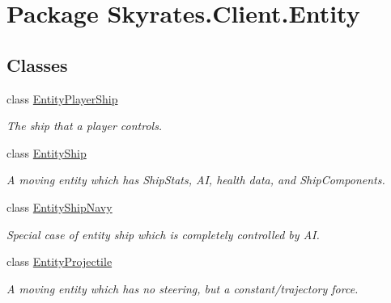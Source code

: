 \hypertarget{namespace_skyrates_1_1_client_1_1_entity}{\section{Package Skyrates.\-Client.\-Entity}
\label{namespace_skyrates_1_1_client_1_1_entity}
}
\subsection*{Classes}
\begin{DoxyCompactItemize}
\item 
class \hyperlink{class_skyrates_1_1_client_1_1_entity_1_1_entity_player_ship}{Entity\-Player\-Ship}
\begin{DoxyCompactList}\small\item\em The ship that a player controls. \end{DoxyCompactList}\item 
class \hyperlink{class_skyrates_1_1_client_1_1_entity_1_1_entity_ship}{Entity\-Ship}
\begin{DoxyCompactList}\small\item\em A moving entity which has Ship\-Stats, A\-I, health data, and Ship\-Components. \end{DoxyCompactList}\item 
class \hyperlink{class_skyrates_1_1_client_1_1_entity_1_1_entity_ship_navy}{Entity\-Ship\-Navy}
\begin{DoxyCompactList}\small\item\em Special case of entity ship which is completely controlled by A\-I. \end{DoxyCompactList}\item 
class \hyperlink{class_skyrates_1_1_client_1_1_entity_1_1_entity_projectile}{Entity\-Projectile}
\begin{DoxyCompactList}\small\item\em A moving entity which has no steering, but a constant/trajectory force. \end{DoxyCompactList}\end{DoxyCompactItemize}
